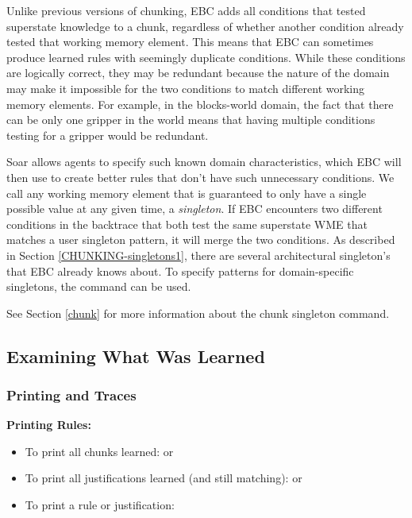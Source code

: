 Unlike previous versions of chunking, EBC adds all conditions that tested superstate knowledge to a chunk, regardless of whether another condition already tested that working memory element.  This means that EBC can sometimes produce learned rules with seemingly duplicate conditions.  While these conditions are logically correct, they may be redundant because the nature of the domain may make it impossible for the two conditions to match different working memory elements.  For example, in the blocks-world domain, the fact that there can be only one gripper in the world means that having multiple conditions testing for a gripper would be redundant.  

Soar allows agents to specify such known domain characteristics, which EBC will then use to create better rules that don't have such unnecessary conditions.  We call any working memory element that is guaranteed to only have a single possible value at any given time, a \textit{singleton}.  If EBC encounters two different conditions in the backtrace that both test the same superstate WME that matches a user singleton pattern, it will merge the two conditions. As described in Section \ref{CHUNKING-singletons1}, there are several architectural singleton's that EBC already knows about.  To specify patterns for domain-specific singletons, the  command can be used. 

See Section \ref{chunk} for more information about the chunk singleton command.

\subsection{Examining What Was Learned}

\subsubsection{Printing and Traces}

\textbf{Printing Rules:}
\begin{itemize}
	\item To print all chunks learned: \newline  {} or 
	\item To print all justifications learned (and still matching):  \newline {} or 
	\item To print a rule or justification: \newline  {}
\end{itemize}

